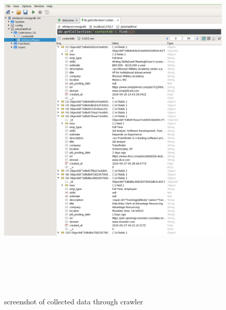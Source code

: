 \begin{figure}[h!]
  \centering
  \includegraphics[width=12cm,height=18cm,keepaspectratio]{../media/crawler/collecteddata.png}
  \caption{screenshot of collected data through crawler}
  \label{fig:mongo_data}
\end{figure}
\pagebreak


\pagebreak

